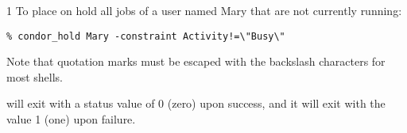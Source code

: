 \begin{ManPage}{\label{man-condor-hold}}{1}
\Examples
To place on hold all jobs of a user named Mary that are not currently running:
\footnotesize
\begin{verbatim}
% condor_hold Mary -constraint Activity!=\"Busy\"
\end{verbatim}
\normalsize
Note that quotation marks must be escaped with the backslash characters
for most shells.


\ExitStatus

 will exit with a status value of 0 (zero) upon success,
and it will exit with the value 1 (one) upon failure.

\end{ManPage}
